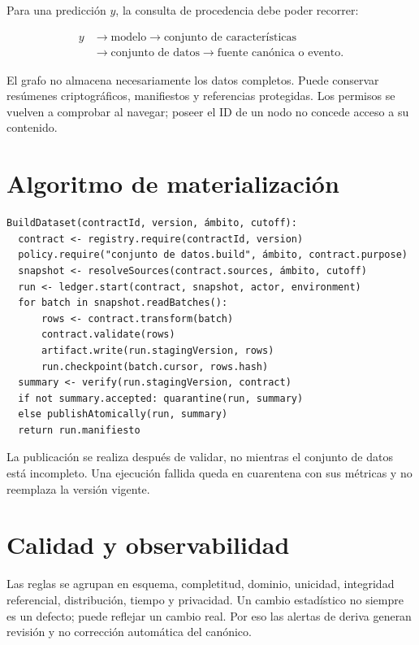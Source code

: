Para una predicción $y$, la consulta de procedencia debe poder recorrer:

\begin{equation}
\begin{aligned}
y&\rightarrow \text{modelo}\rightarrow \text{conjunto de características}\\
 &\rightarrow \text{conjunto de datos}\rightarrow \text{fuente canónica o evento}.
\end{aligned}
\end{equation}

El grafo no almacena necesariamente los datos completos. Puede conservar resúmenes criptográficos,
manifiestos y referencias protegidas. Los permisos se vuelven a comprobar al navegar;
poseer el ID de un nodo no concede acceso a su contenido.

\section{Algoritmo de materialización}

\begin{verbatim}
BuildDataset(contractId, version, ámbito, cutoff):
  contract <- registry.require(contractId, version)
  policy.require("conjunto de datos.build", ámbito, contract.purpose)
  snapshot <- resolveSources(contract.sources, ámbito, cutoff)
  run <- ledger.start(contract, snapshot, actor, environment)
  for batch in snapshot.readBatches():
      rows <- contract.transform(batch)
      contract.validate(rows)
      artifact.write(run.stagingVersion, rows)
      run.checkpoint(batch.cursor, rows.hash)
  summary <- verify(run.stagingVersion, contract)
  if not summary.accepted: quarantine(run, summary)
  else publishAtomically(run, summary)
  return run.manifiesto
\end{verbatim}

La publicación se realiza después de validar, no mientras el conjunto de datos está incompleto.
Una ejecución fallida queda en cuarentena con sus métricas y no reemplaza la versión
vigente.

\section{Calidad y observabilidad}

Las reglas se agrupan en esquema, completitud, dominio, unicidad, integridad referencial,
distribución, tiempo y privacidad. Un cambio estadístico no siempre es un defecto; puede
reflejar un cambio real. Por eso las alertas de deriva generan revisión y no corrección
automática del canónico.

